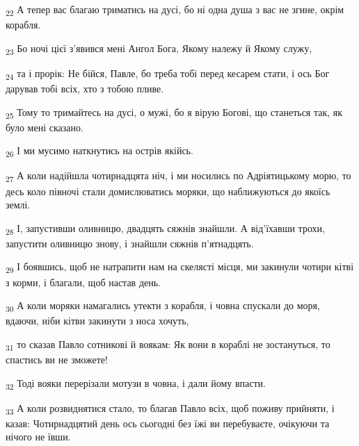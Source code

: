 \begin{tcolorbox}
\textsubscript{22} А тепер вас благаю триматись на дусі, бо ні одна душа з вас не згине, окрім корабля.
\end{tcolorbox}
\begin{tcolorbox}
\textsubscript{23} Бо ночі цієї з'явився мені Ангол Бога, Якому належу й Якому служу,
\end{tcolorbox}
\begin{tcolorbox}
\textsubscript{24} та і прорік: Не бійся, Павле, бо треба тобі перед кесарем стати, і ось Бог дарував тобі всіх, хто з тобою пливе.
\end{tcolorbox}
\begin{tcolorbox}
\textsubscript{25} Тому то тримайтесь на дусі, о мужі, бо я вірую Богові, що станеться так, як було мені сказано.
\end{tcolorbox}
\begin{tcolorbox}
\textsubscript{26} І ми мусимо наткнутись на острів якійсь.
\end{tcolorbox}
\begin{tcolorbox}
\textsubscript{27} А коли надійшла чотирнадцята ніч, і ми носились по Адріятицькому морю, то десь коло півночі стали домислюватись моряки, що наближуються до якоїсь землі.
\end{tcolorbox}
\begin{tcolorbox}
\textsubscript{28} І, запустивши оливницю, двадцять сяжнів знайшли. А від'їхавши трохи, запустити оливницю знову, і знайшли сяжнів п'ятнадцять.
\end{tcolorbox}
\begin{tcolorbox}
\textsubscript{29} І боявшись, щоб не натрапити нам на скелясті місця, ми закинули чотири кітві з корми, і благали, щоб настав день.
\end{tcolorbox}
\begin{tcolorbox}
\textsubscript{30} А коли моряки намагались утекти з корабля, і човна спускали до моря, вдаючи, ніби кітви закинути з носа хочуть,
\end{tcolorbox}
\begin{tcolorbox}
\textsubscript{31} то сказав Павло сотникові й воякам: Як вони в кораблі не зостануться, то спастись ви не зможете!
\end{tcolorbox}
\begin{tcolorbox}
\textsubscript{32} Тоді вояки перерізали мотузи в човна, і дали йому впасти.
\end{tcolorbox}
\begin{tcolorbox}
\textsubscript{33} А коли розвиднятися стало, то благав Павло всіх, щоб поживу прийняти, і казав: Чотирнадцятий день ось сьогодні без їжі ви перебуваєте, очікуючи та нічого не ївши.
\end{tcolorbox}
